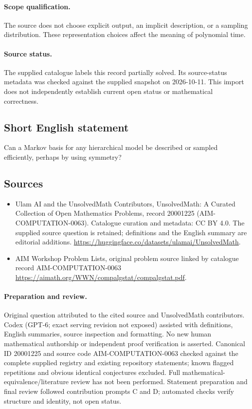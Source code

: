\documentclass[11pt]{article}
\begin{document}
\paragraph{Scope qualification.}
The source does not choose explicit output, an implicit description, or a sampling distribution. These representation choices affect the meaning of polynomial time.
\paragraph{Source status.}
The supplied catalogue labels this record partially solved. Its source-status metadata was checked against the supplied snapshot on 2026-10-11. This import does not independently establish current open status or mathematical correctness.
\subsection{Short English statement}
Can a Markov basis for any hierarchical model be described or sampled efficiently, perhaps by using symmetry?
\subsection{Sources}
\begin{itemize}
\item[S1] Ulam AI and the UnsolvedMath Contributors, UnsolvedMath: A Curated Collection of Open Mathematics Problems, record 20001225 (AIM-COMPUTATION-0063). Catalogue curation and metadata: CC BY 4.0. The supplied source question is retained; definitions and the English summary are editorial additions.
\url{https://huggingface.co/datasets/ulamai/UnsolvedMath}.
\item[S2] AIM Workshop Problem Lists, original problem source linked by catalogue record AIM-COMPUTATION-0063
\url{https://aimath.org/WWN/compalgstat/compalgstat.pdf}.
\end{itemize}
\paragraph{Preparation and review.}
Original question attributed to the cited source and UnsolvedMath contributors. Codex (GPT-6; exact serving revision not exposed) assisted with definitions, English summaries, source inspection and formatting. No new human mathematical authorship or independent proof verification is asserted. Canonical ID 20001225 and source code AIM-COMPUTATION-0063 checked against the complete supplied registry and existing repository statements; known flagged repetitions and obvious identical conjectures excluded. Full mathematical-equivalence/literature review has not been performed. Statement preparation and final review followed contribution prompts C and D; automated checks verify structure and identity, not open status.
\label{end:20001225}
\end{document}
